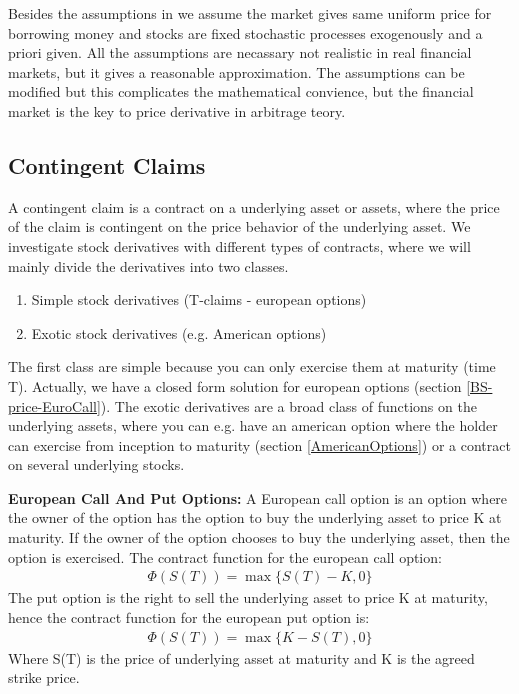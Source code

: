 Besides the assumptions in \parencite{finKont} we assume the market gives same uniform price for borrowing money and stocks are fixed stochastic processes exogenously and a priori given. All the assumptions are necassary not realistic in real financial markets, but it gives a reasonable approximation.  The assumptions can be modified but this complicates the mathematical convience, but the financial market is the key to price derivative in arbitrage teory.


\subsection{Contingent Claims}
A contingent claim is a contract on a underlying asset or assets, where the price of the claim is contingent on the price behavior of the underlying asset. We investigate stock derivatives with different types of contracts, where we will mainly divide the derivatives into two classes. 
\begin{enumerate}
\item Simple stock derivatives (T-claims - european options)
\item Exotic stock derivatives (e.g. American options)
\end{enumerate}
The first class are simple because you can only exercise them at maturity (time T). Actually, we have a closed form solution for european options (section \ref{BS-price-EuroCall}). The exotic derivatives are a broad class of functions on the underlying assets, where you can e.g. have an american option where the holder can exercise from inception to maturity (section \ref{AmericanOptions}) or a contract on several underlying stocks.

\theoremstyle{definition}
\begin{definition}{\textbf{European Call And Put Options:}}\label{def:CallOptions}
A European call option is an option where the owner of the option has the option to buy the underlying asset to price K at maturity. If the owner of the option chooses to buy the underlying asset, then the option is exercised. The contract function for the european call option:
\begin{equation}
\begin{split}
\Phi(S(T))=\max\{S(T)-K, 0\}
\end{split}
\end{equation}
The put option is the right to sell the underlying asset to price K at maturity, hence the contract function for the european put option is:
\begin{equation}
\begin{split}
\Phi(S(T))=\max\{K-S(T), 0\}
\end{split}
\end{equation}
Where S(T) is the price of underlying asset at maturity and K is the agreed strike price.
\end{definition}


